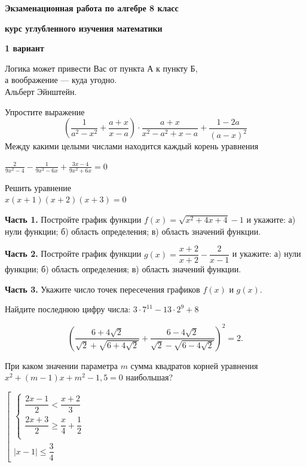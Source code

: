 \centerline{\Huge \bf  Экзаменационная работа по алгебре 8 класс}
\centerline{\Huge \bf курс углубленного изучения математики}
\centerline{\Large \bf 1 вариант}

\begin{flushright}
    \scriptsize{Логика может привести Вас от пункта А к пункту Б,\\ а воображение — куда угодно.\\ Альберт Эйнштейн.}
\end{flushright}

Упростите выражение
\[ \left( \dfrac{1}{a^2 - x^2} + \dfrac{a+x}{x-a}\right)\cdot\dfrac{a+x}{x^2 - a^2 + x-a} + \dfrac{1-2a}{(a-x)^2}\]
Между какими целыми числами находится каждый корень уравнения

\noindent
$\frac{2}{9x^2 - 4} - \frac{1}{9x^2 - 6x} + \frac{3x - 4}{9x^2 + 6x} = 0$

Решить уравнение\\ 
$x(x+1)(x+2)(x+3)=0$
 
\textbf{Часть 1.} Постройте график функции $f(x) = \sqrt{x^2+4x+4}-1$ и укажите: а) нули функции; б) область определения; в) область значений функции. 

\noindent
\textbf{Часть 2.} Постройте график функции $g(x) = \dfrac{x+2}{x+2} - \dfrac{2}{x-1}$ и укажите: а) нули функции; б) область определения; в) область значений функции.

\noindent
\textbf{Часть 3.} Укажите число точек пересечения графиков $f(x)$ и $g(x).$

Найдите последнюю цифру числа: 
$3 \cdot 7^{11} - 13 \cdot 2^9 +8$

\[\left( \frac{6 + 4\sqrt{2}}{\sqrt{2} + \sqrt{6 + 4\sqrt{2}}} + \frac{6 - 4\sqrt{2}}{\sqrt{2} - \sqrt{6 - 4\sqrt{2}}} \right)^2 = 2.\]

При каком значении параметра $m$ сумма квадратов корней уравнения  $x^2+(m-1)x+m^2-1,5=0$ наибольшая?

$
\left[ 
  \begin{gathered} 
    \left\{ 
      \begin{gathered} 
        \dfrac{2x-1}{2}<\dfrac{x+2}{3}
        \\  
        \dfrac{2x+3}{2}\geq \dfrac{x}{4}+\dfrac{1}{2}
        \\
      \end{gathered} 
    \right.  
    \\ 
    |x-1| \leq \dfrac{3}{4}
  \end{gathered}
  \right.
$

